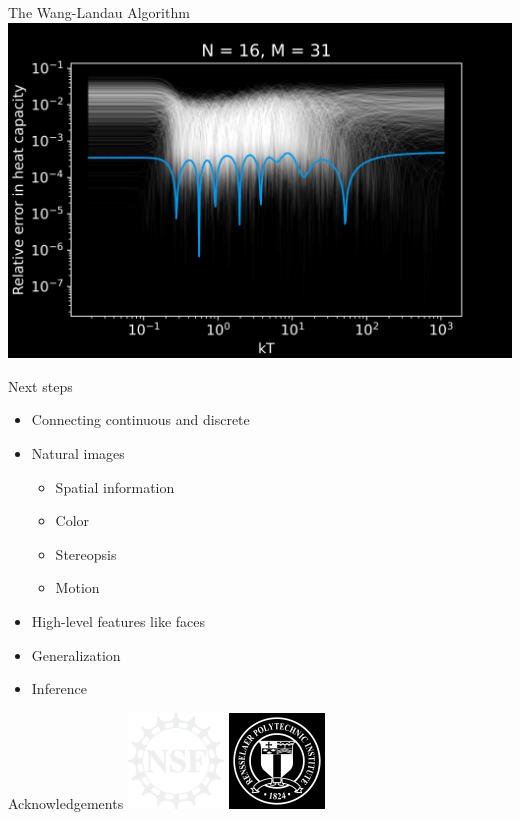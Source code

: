 \documentclass[14pt,c]{beamer}
\begin{document}
\begin{frame}{The Wang-Landau Algorithm}
  \centering
  \includegraphics[width=0.9\framewidth]{wanglandau-bw-C-relerror}
\end{frame}

\begin{frame}{Next steps}
  \begin{itemize}
    \item Connecting continuous and discrete
    \item Natural images
      \begin{itemize}
        \item Spatial information
        \item Color
        \item Stereopsis
        \item Motion
      \end{itemize}
    \item High-level features like faces
    \item Generalization
    \item Inference
  \end{itemize}
\end{frame}

\begin{frame}{Acknowledgements}
  \centering
  \includegraphics[width=1in]{nsf}
  \quad
  \includegraphics[width=1in]{rpi}
\end{frame}
\end{document}
